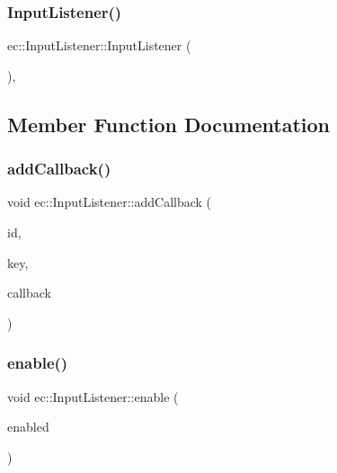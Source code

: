\mbox{\label{classec_1_1_input_listener_aa44d25c2b2d3ef5e72611831fd66e10c}} 
\subsubsection{\texorpdfstring{Input\+Listener()}{InputListener()}}
{\footnotesize\ttfamily ec\+::\+Input\+Listener\+::\+Input\+Listener (\begin{DoxyParamCaption}{ }\end{DoxyParamCaption})\hspace{0.3cm}{\ttfamily [explicit]}, {\ttfamily [protected]}}



\subsection{Member Function Documentation}
\mbox{\label{classec_1_1_input_listener_a9d43ca3fbda2db5809b29d7f237d41c4}} 
\subsubsection{\texorpdfstring{add\+Callback()}{addCallback()}}
{\footnotesize\ttfamily void ec\+::\+Input\+Listener\+::add\+Callback (\begin{DoxyParamCaption}\item[{const std\+::string \&}]{id,  }\item[{\mbox{\hyperlink{classec_1_1_input_listener_af5dfb691564fa8e05fcf7f053e3c532b}{Event\+Key\+\_\+\+Type}}}]{key,  }\item[{std\+::function$<$ void()$>$}]{callback }\end{DoxyParamCaption})}

\mbox{\label{classec_1_1_input_listener_a459a44443e7de70e854c2175b6c6914d}} 
\subsubsection{\texorpdfstring{enable()}{enable()}}
{\footnotesize\ttfamily void ec\+::\+Input\+Listener\+::enable (\begin{DoxyParamCaption}\item[{bool}]{enabled }\end{DoxyParamCaption})\hspace{0.3cm}{\ttfamily [virtual]}}

